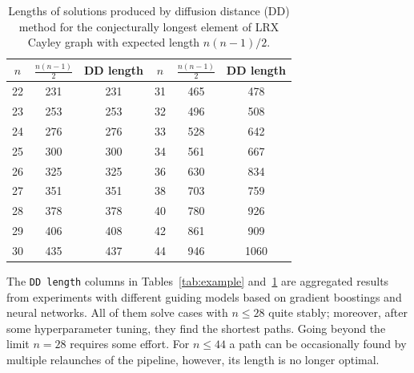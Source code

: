 \documentclass[reqno,11pt]{amsart}
\begin{document}
\begin{table}[ht]
    \centering
    \begin{tabular}{|c|c|c||c|c|c|}
\hline
$n$  & $\frac{n(n-1)}{2}$ & DD length &
$n$  & $\frac{n(n-1)}{2}$ & DD length \\
\hline\hline
22 & 231 & 231  & 31 & 465 & 478 \\
\hline
23 & 253 & 253  & 32 & 496 & 508 \\
\hline
24 & 276 & 276  & 33 & 528 & 642 \\
\hline
25 & 300 & 300  & 34 & 561 & 667 \\
\hline
26 & 325 & 325  & 36 & 630 & 834 \\
\hline
27 & 351 & 351  & 38 & 703 & 759 \\
\hline
28 & 378 & 378  & 40 & 780 & 926 \\
\hline
29 & 406 & 408  & 42 & 861 & 909 \\
\hline
30 & 435 & 437  & 44 & 946 & 1060 \\
\hline
\end{tabular}
    \captionsetup{skip=10pt} 
    \caption{Lengths of solutions produced by diffusion distance (DD) method for the conjecturally longest element of LRX Cayley graph with expected length $n(n-1)/2$.  }
    \label{tab:example_nn}
\end{table}

The \texttt{DD length} columns in Tables~\ref{tab:example} and~\ref{tab:example_nn} are aggregated results from experiments with different guiding models based on gradient boostings and neural networks.
All of them solve cases with $n\le 28$ quite stably; moreover, after some hyperparameter tuning, they find the shortest paths. Going beyond the limit $n=28$ requires some effort. For $n\le 44$ a path can be occasionally found by multiple relaunches of the pipeline, however, its length is no longer optimal.
\end{document}
